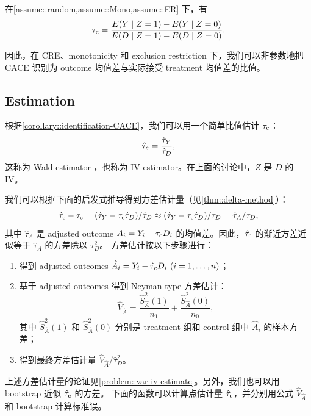\begin{corollary}
\label{corollary::identification-CACE}
在\cref{assume::random,assume::Mono,assume::ER} 下，有
$$
\tau_{\textup{c}} = \frac{ E(Y\mid Z=1) - E(Y\mid Z=0) }{ E(D\mid Z=1) - E(D \mid Z=0) } .
$$
\end{corollary}


因此，在 CRE、monotonicity 和 exclusion restriction 下，我们可以非参数地把 CACE 识别为 outcome 均值差与实际接受 treatment 均值差的比值。



\subsection{Estimation}
\label{sec::estimation-IV}


根据\cref{corollary::identification-CACE}，我们可以用一个简单比值估计 $\tau_{\textup{c}}$：
$$
\hat{\tau}_{\textup{c}}  = \frac{  \hat{\tau}_Y }{  \hat{\tau}_D  } ,
$$ 
这称为 Wald estimator \citep{wald1940fitting}，也称为 IV estimator。在上面的讨论中，$Z$ 是 $D$ 的 IV。



我们可以根据下面的启发式推导得到方差估计量（见\cref{thm::delta-method}）：
$$
\hat{\tau}_{\textup{c}} - \tau_{\textup{c}}  = ( \hat{\tau}_Y  -  \tau_{\textup{c}}\hat{\tau}_D)/\hat{\tau}_D 
\approx  ( \hat{\tau}_Y  -  \tau_{\textup{c}}\hat{\tau}_D)/ \tau_D 
= \hat{\tau}_A / \tau_D ,
$$ 
其中 $\hat{\tau}_A$ 是 adjusted outcome $A_i = Y_i -  \tau_{\textup{c}} D_i$ 的均值差。因此，$\hat{\tau}_{\textup{c}}$ 的渐近方差近似等于 $\hat{\tau}_A$ 的方差除以 $\tau_D^2$。
方差估计按以下步骤进行：
\begin{enumerate}
\item
得到 adjusted outcomes $\hat{A}_i =  Y_i -  \hat{\tau}_{\textup{c}} D_i\ (i=1, \ldots, n)$；

\item
基于 adjusted outcomes 得到 Neyman-type 方差估计：
$$
\hat{V}_{\hat{A}} = \frac{\hat{S}_{\hat{A}}^2(1)}{n_1} + \frac{\hat{S}_{\hat{A}}^2(0)}{n_0},
$$
其中 $\hat{S}_{\hat{A}}^2(1)$ 和 $\hat{S}_{\hat{A}}^2(0)$ 分别是 treatment 组和 control 组中 $\hat{A}_i $ 的样本方差；

\item
得到最终方差估计量 $ \hat{V}_{\hat{A}} /  \hat{\tau}_D ^2 $。
\end{enumerate}


上述方差估计量的论证见\cref{problem::var-iv-estimate}。另外，我们也可以用 bootstrap 近似 $\hat{\tau}_{\textup{c}} $ 的方差。
下面的函数可以计算点估计量 $\hat{\tau}_{\textup{c}} $，并分别用公式 $\hat{V}_{\hat{A}} $ 和 bootstrap 计算标准误。

